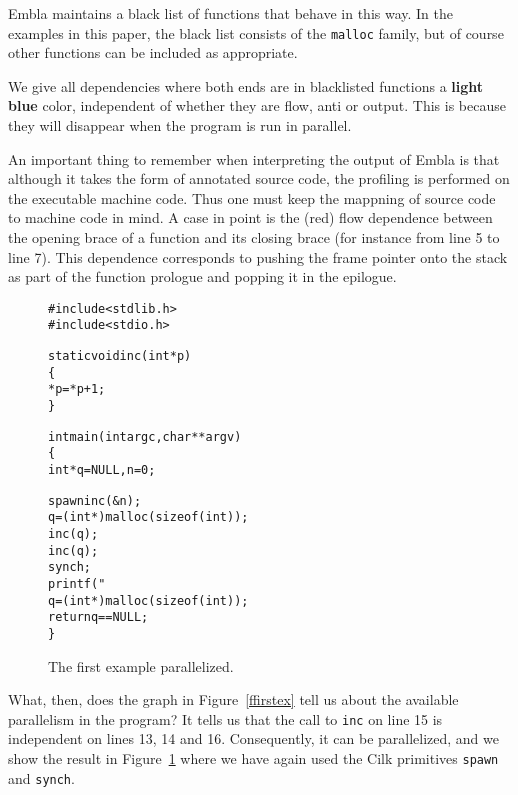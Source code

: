 Embla maintains a black list of functions that behave in this way.
In the examples in this paper, the black list consists of the 
{\tt malloc} family, but of course other functions can be included 
as appropriate. 

We give all dependencies where both ends are in blacklisted functions 
a {\bf \color{cyan}light blue} color, independent of whether they are 
flow, anti or output. This is because they will disappear when the
program is run in parallel.

An important thing to remember when interpreting the output of Embla 
is that although it takes the form of annotated source code, the 
profiling is performed on the executable machine code. Thus one must
keep the mappning of source code to machine code in mind. A case in 
point is the (red) flow dependence between the opening brace of a 
function and its closing brace (for instance from line 5 to line 7).
This dependence corresponds to pushing the frame pointer onto the 
stack as part of the function prologue and popping it in the 
epilogue.

\begin{figure}
\small
\hrulefill
\begin{alltt}
#include <stdlib.h>
#include <stdio.h>

static void inc(int *p)
\verb+{+
   *p=*p+1;
\verb+}+

int main(int argc, char **argv)
\verb+{+
   int *q=NULL,n=0;

   {\color{red}spawn} inc(&n);
   q = (int*) malloc( sizeof(int) );
   inc(q);
   inc(q);
   {\color{red}synch;}
   printf( "%d\verb+\+n", *q+n );
   q = (int*) malloc( sizeof(int) );
   return q==NULL;
\verb+}+
\end{alltt}
\hrulefill
\caption{The first example parallelized.}
\label{fparfirstex}
\end{figure}

What, then, does the graph in Figure~\ref{ffirstex} tell us about
the available parallelism in the program? It tells us that 
the call to {\tt inc} on line 15 is independent on lines 13, 14
and 16. Consequently, it can be parallelized, and we show the
result in Figure~\ref{fparfirstex} where we have again used the 
Cilk primitives {\tt spawn} and {\tt synch}.

\begin{figure} 
\small

\end{figure}

